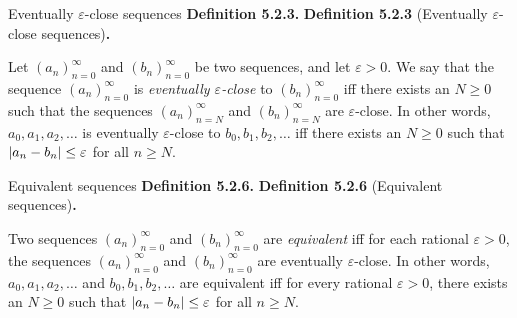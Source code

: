 \documentclass[12pt]{article}
\newenvironment{df}[2][\relax]{
\vspace{4mm}
    \noindent\setlength{\parskip}{1em}%
    \ifx#1\relax%
        \textbf{#2. }%
    \else%
        \textbf{#2} (#1)\textbf{. }%
    \fi%
    \ignorespaces%
}{}
\theoremstyle{remark}
\begin{document}
\begin{df}[Eventually $\varepsilon$-close sequences]{Definition 5.2.3}
    Let $(a_n)^\infty_{n=0}$ and $(b_n)^\infty_{n=0}$ be two sequences, and let $\varepsilon > 0$.
    We say that the sequence $(a_n)^\infty_{n=0}$ is \emph{eventually $\varepsilon$-close} to $(b_n)^\infty_{n=0}$ iff there exists an $N \ge 0$ such that the sequences $(a_n)^\infty_{n=N}$ and $(b_n)^\infty_{n=N}$ are $\varepsilon$-close.
    In other words, $a_0, a_1, a_2, \ldots$ is eventually $\varepsilon$-close to $b_0, b_1, b_2, \ldots$ iff there exists an $N \ge 0$ such that $\abs{a_n - b_n} \le \varepsilon$ for all $n \ge N$.
\end{df}


\begin{df}[Equivalent sequences]{Definition 5.2.6}
    Two sequences $(a_n)^\infty_{n=0}$ and $(b_n)^\infty_{n=0}$ are \emph{equivalent} iff for each rational $\varepsilon > 0$, the sequences $(a_n)^\infty_{n=0}$ and $(b_n)^\infty_{n=0}$ are eventually $\varepsilon$-close.
    In other words, $a_0, a_1, a_2, \ldots$ and $b_0, b_1, b_2, \ldots$ are equivalent iff for every rational $\varepsilon > 0$, there exists an $N \ge 0$ such that $\abs{a_n - b_n} \le \varepsilon$  for all $n \ge N$.
\end{df}
\end{document}
